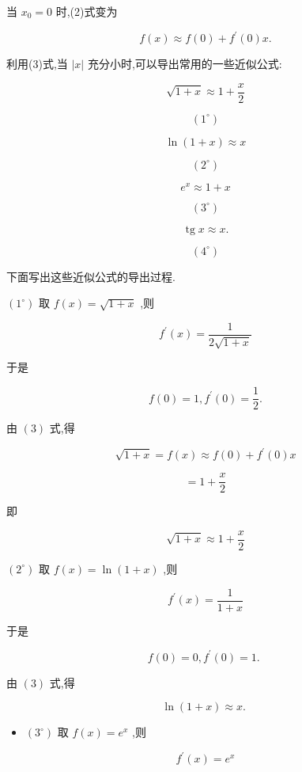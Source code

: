 \documentclass[lang=cn,newtx,10pt,scheme=chinese]{elegantbook}
\begin{document}
当 \({x}_{0} = 0\) 时,(2)式变为

\[
f\left( x\right) \approx f\left( 0\right) + {f}^{\prime }\left( 0\right) x. \tag{3}
\]

利用(3)式,当 \(\left| x\right|\) 充分小时,可以导出常用的一些近似公式:

\[
\sqrt{1 + x} \approx 1 + \frac{x}{2}
\]

\[
\left( {1}^{ \circ }\right)
\]

\[
\ln \left( {1 + x}\right) \approx x
\]

\[
\left( {2}^{ \circ }\right)
\]

\[
{e}^{x} \approx 1 + x
\]

\[
\left( {3}^{ \circ }\right)
\]

\[
\operatorname{tg}x \approx x\text{.}
\]

\[
\left( {4}^{ \circ }\right)
\]

下面写出这些近似公式的导出过程.

\(\left( {1}^{ \circ }\right)\) 取 \(f\left( x\right) = \sqrt{1 + x}\) ,则

\[
{f}^{\prime }\left( x\right) = \frac{1}{2\sqrt{1 + x}}
\]

于是

\[
f\left( 0\right) = 1,{f}^{\prime }\left( 0\right) = \frac{1}{2}.
\]

由 \(\left( 3\right)\) 式,得

\[
\sqrt{1 + x} = f\left( x\right) \approx f\left( 0\right) + {f}^{\prime }\left( 0\right) x
\]

\[
= 1 + \frac{x}{2}
\]

即

\[
\sqrt{1 + x} \approx 1 + \frac{x}{2}
\]

\(\left( {2}^{ \circ }\right)\) 取 \(f\left( x\right) = \ln \left( {1 + x}\right)\) ,则

\[
{f}^{\prime }\left( x\right) = \frac{1}{1 + x}
\]

于是

\[
f\left( 0\right) = 0,{f}^{\prime }\left( 0\right) = 1\text{. }
\]

由 \(\left( 3\right)\) 式,得

\[
\ln \left( {1 + x}\right) \approx x\text{. }
\]

\begin{itemize}
\item \(\left( {3}^{ \circ }\right)\) 取 \(f\left( x\right) = {e}^{x}\) ,则
\end{itemize}

\[
{f}^{\prime }\left( x\right) = {e}^{x}
\]
\end{document}
